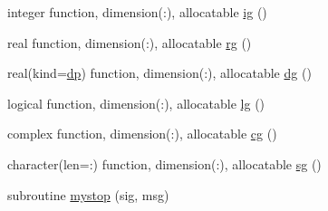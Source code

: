 \begin{DoxyCompactItemize}
\item 
integer function, dimension(\+:), allocatable \mbox{\hyperlink{namespacem__cli2_a11c3cc864e613c90b2a02c7409c00828}{ig}} ()
\item 
real function, dimension(\+:), allocatable \mbox{\hyperlink{namespacem__cli2_aff7a379ff1e7269001592f452ab017c8}{rg}} ()
\item 
real(kind=\mbox{\hyperlink{namespacem__cli2_acf83f1963cf6a56ad0221cfcf5402440}{dp}}) function, dimension(\+:), allocatable \mbox{\hyperlink{namespacem__cli2_a06ddc2533e5122b8f898bae7db0fea87}{dg}} ()
\item 
logical function, dimension(\+:), allocatable \mbox{\hyperlink{namespacem__cli2_aa1653cf1d6ce9739c1dcfdcb5361fa5f}{lg}} ()
\item 
complex function, dimension(\+:), allocatable \mbox{\hyperlink{namespacem__cli2_af45e2401f7c3c2309fe92882c1d5e521}{cg}} ()
\item 
character(len=\+:) function, dimension(\+:), allocatable \mbox{\hyperlink{namespacem__cli2_abc94b8f97a6056ea48ce48ab460bdf78}{sg}} ()
\item 
subroutine \mbox{\hyperlink{namespacem__cli2_a0e44d7c9058545df8bf09674e9c2e799}{mystop}} (sig, msg)
\end{DoxyCompactItemize}

